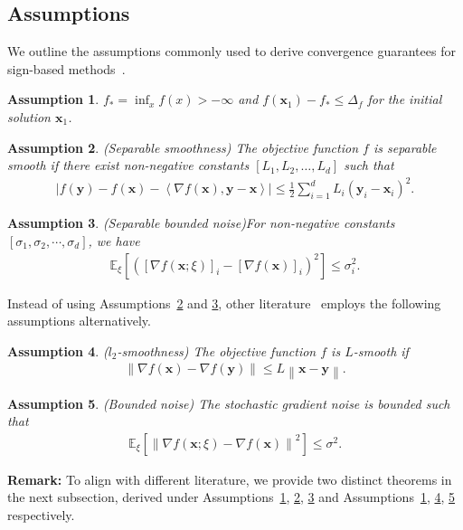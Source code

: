 \documentclass{article}
\newtheorem{ass}{Assumption}
\newcommand{\Norm}[1]{\left\|#1\right\|}
\def \x {\mathbf{x}}
\def \y {\mathbf{y}}
\newcommand{\abs}[1]{\left|#1\right|}
\def \y {\mathbf{y}}
\def \x {\mathbf{x}}
\begin{document}
\subsection{Assumptions}
We outline the assumptions commonly used to derive convergence guarantees for sign-based methods~\citep{pmlr-v80-bernstein18a, bernstein2018signsgd}.
\begin{ass}\label{ass:below} $f_{*}=\inf_x f(x) > -\infty$ and $f(\x_1) - f_{*} \leq \Delta_f$ for the initial solution $\x_1$.
\end{ass}
\begin{ass}\label{ass:1-1} (Separable smoothness) The objective function $f$ is separable smooth if there exist non-negative constants $\left[L_1, L_2, \dots, L_d \right]$ such that
\begin{align*}
    \abs{ f(\y) -f(\x) - \left\langle \nabla f(\x), \y - \x \right\rangle} \leq   \frac{1}{2}\sum_{i=1}^d L_i (\y_i - \x_i)^2 .
\end{align*}
\end{ass}
\begin{ass}(Separable bounded noise)\label{asm:noise} For non-negative constants $\left[ \sigma_1,\sigma_2,\cdots,\sigma_d\right]$, we have
    \begin{align*}
        \mathbb{E}_{\xi} \left[\left(\left[\nabla f(\x;\xi)\right]_i - \left[\nabla f(\mathbf{x})\right]_i \right)^2\right] \leq \sigma_i^{2}.
    \end{align*}
\end{ass}
Instead of using Assumptions~\ref{ass:1-1} and \ref{asm:noise}, other literature~\citep{pmlr-v202-sun23l, NeurIPS:2024:Jiang:B} employs the following assumptions alternatively.
\begin{ass}\label{ass:1} ($l_2$-smoothness) The objective function $f$ is $L$-smooth if
\begin{align*}
    \Norm{\nabla f(\x) -\nabla f(\y)} \leq L \Norm{\x-\y}.
\end{align*}
\end{ass}
\begin{ass}\label{ass:3} (Bounded noise) The stochastic gradient noise is bounded such that
\begin{equation*}
\begin{split}
 \mathbb{E}_{\xi}\left[\left\|\nabla f(\x;\xi) -\nabla f(\mathbf{x})\right\|^{2}\right] \leq \sigma^{2}.
\end{split}
\end{equation*} 
\end{ass}
\textbf{Remark:} To align with different literature, we provide two distinct theorems in the next subsection, derived under Assumptions~\ref{ass:below}, \ref{ass:1-1}, \ref{asm:noise} and Assumptions~\ref{ass:below}, \ref{ass:1}, \ref{ass:3} respectively. 
\end{document}
